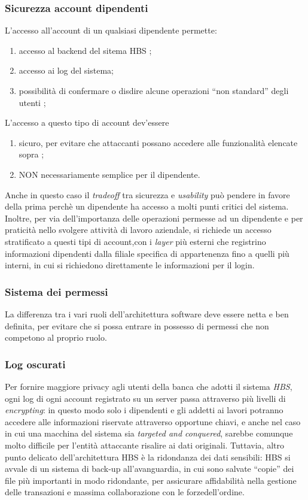 	\subsubsection{Sicurezza account dipendenti}
L'accesso all'account di un qualsiasi dipendente permette:
\begin{enumerate}
\item accesso al backend del sitema HBS ;
\item accesso ai log del sistema;
\item possibilità di confermare o disdire alcune operazioni ``non standard'' degli utenti ;
\end{enumerate}
L'accesso a questo tipo di account dev'essere
\begin{enumerate}
\item sicuro, per evitare che attaccanti possano accedere alle funzionalità elencate sopra ;
\item NON necessariamente semplice per il dipendente.
\end{enumerate}
Anche in questo caso il \emph{tradeoff} tra sicurezza e \emph{usability} può pendere in favore della prima perchè un dipendente ha accesso a molti punti critici del sistema. Inoltre, per via dell'importanza delle operazioni permesse ad un dipendente e per praticità nello svolgere attività di lavoro aziendale, si richiede un accesso stratificato a questi tipi di account,con i \emph{layer} più esterni che registrino informazioni dipendenti dalla filiale specifica di appartenenza fino a quelli più interni, in cui si richiedono direttamente le informazioni per il login.


	\subsubsection{Sistema dei permessi}
La differenza tra i vari ruoli dell'architettura software deve essere netta e ben definita, per evitare che si possa entrare in possesso di permessi che non competono al proprio ruolo.



	\subsubsection{Log oscurati}
Per fornire maggiore privacy agli utenti della banca che adotti il sistema \emph{HBS}, ogni log di ogni account registrato su un server passa attraverso più livelli di \emph{encrypting}: in questo modo solo i dipendenti e gli addetti ai lavori potranno accedere alle informazioni riservate attraverso opportune chiavi, e anche nel caso in cui una macchina del sistema sia \emph{targeted and conquered}, sarebbe comunque molto difficile per l'entità attaccante risalire ai dati originali.
\linebreak
Tuttavia, altro punto delicato dell'architettura HBS è la ridondanza dei dati sensibili: HBS si avvale di un sistema di back-up all'avanguardia, in cui sono salvate ``copie'' dei file più importanti in modo ridondante, per assicurare affidabilità nella gestione delle transazioni e massima collaborazione con le forzedell'ordine.



